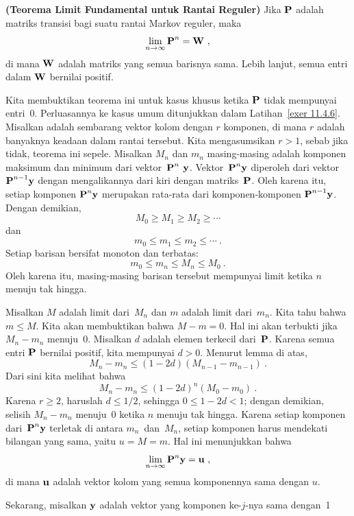 \begin{theorem}{\bf (Teorema Limit Fundamental untuk Rantai Reguler)}
Jika ${\mbox{\bf P}\/}$ adalah matriks transisi bagi suatu rantai Markov reguler, maka
$$
\lim_{n \to \infty} \mat {P}^n = \mat {W}\ ,
$$
di mana ${\mbox{\bf W}\/}$ adalah matriks yang semua barisnya sama. Lebih lanjut, semua
entri dalam ${\mbox{\bf W}\/}$
bernilai positif.

\proof
Kita membuktikan teorema ini untuk kasus khusus ketika ${\mbox{\bf P}\/}$ tidak mempunyai
entri~0. Perluasannya
ke kasus umum ditunjukkan dalam Latihan~\ref{exer 11.4.6}. Misalkan 
adalah sembarang
vektor kolom dengan $r$ komponen, di mana $r$ adalah banyaknya keadaan dalam
rantai tersebut. Kita mengasumsikan
$r > 1$, sebab jika tidak, teorema ini sepele. Misalkan
$M_n$ dan
$m_n$ masing-masing adalah komponen maksimum dan minimum dari
vektor~$\mat {P}^n \mat { y}$. Vektor~$\mat {P}^n \mat {y}$ diperoleh dari
vektor~${\mbox{\bf P}\/}^{n - 1}
{\mbox{\bf y}\/}$ dengan mengalikannya dari kiri dengan matriks~${\mbox{\bf P}\/}$. Oleh karena
itu, setiap komponen
$\mat {P}^n \mat {y}$ merupakan rata-rata dari komponen-komponen ${\mbox{\bf P}\/}^{n - 1}
{\mbox{\bf y}\/}$. Dengan demikian,
$$
M_0 \geq M_1 \geq M_2 \geq\cdots
$$
dan
$$
m_0 \leq m_1 \leq m_2 \leq\cdots\ .
$$
Setiap barisan bersifat monoton dan terbatas:
$$
m_0 \leq m_n \leq M_n \leq M_0\ .
$$
Oleh karena itu, masing-masing barisan tersebut mempunyai limit ketika $n$
menuju tak hingga.
\par
Misalkan $M$ adalah limit dari~$M_n$ dan $m$ adalah limit dari~$m_n$. Kita tahu
bahwa $m \leq M$. Kita akan membuktikan bahwa $M - m = 0$. Hal ini akan terbukti jika
$M_n - m_n$ menuju~0. Misalkan $d$ adalah elemen terkecil dari~${\mbox{\bf P}\/}$.
Karena semua entri ${\mbox{\bf P}\/}$ bernilai positif, kita mempunyai $d > 0$. Menurut
lemma di atas,
$$
M_n - m_n \leq (1 - 2d)(M_{n - 1} - m_{n - 1})\ .
$$
Dari sini kita melihat bahwa
$$
M_n - m_n \leq (1 - 2d)^n(M_0 - m_0)\ .
$$
Karena $r \ge 2$, haruslah $d \leq 1/2$, sehingga $0 \leq 1 - 2d < 1$; dengan
demikian, selisih $M_n - m_n$ menuju~0 ketika $n$ menuju tak hingga. Karena setiap
komponen dari~$\mat {P}^n \mat {y}$ terletak di antara $m_n$~dan~$M_n$, setiap
komponen harus
mendekati bilangan yang sama, yaitu $u = M = m$.
Hal ini menunjukkan bahwa
$$
\lim_{n \to \infty} {\mbox{\bf P}\/}^n {\mbox{\bf y}\/} = {\mbox{\bf u}\/}\ ,  \label{eq 11.4.4}
$$
di mana ${\mbox{\bf u}\/}$ adalah vektor kolom yang semua komponennya sama dengan $u$.
\par
Sekarang, misalkan ${\mbox{\bf y}\/}$ adalah vektor yang komponen ke-$j$-nya sama dengan~1

\end{theorem}
